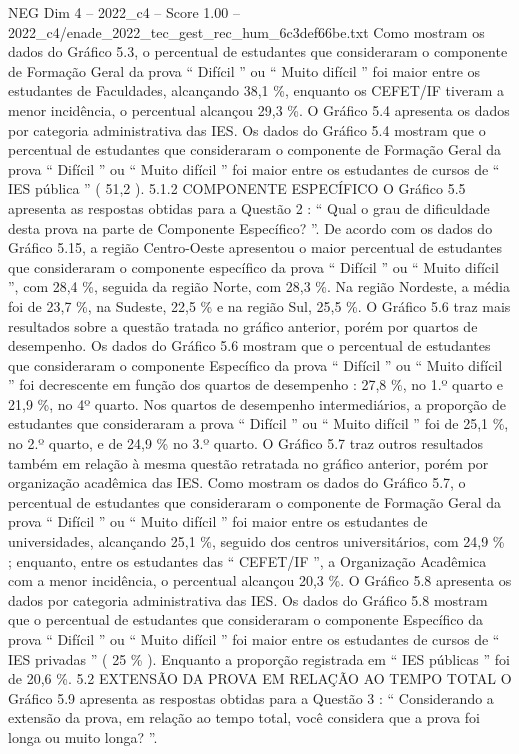 \begin{textsample}{NEG Dim 4 – 2022\_c4 – Score 1.00 – 2022\_c4/enade\_2022\_tec\_gest\_rec\_hum\_6c3def66be.txt}
Como mostram os dados do Gráfico 5.3, o percentual de estudantes que consideraram o componente de Formação Geral da prova “ Difícil ” ou “ Muito difícil ” foi maior entre os estudantes de Faculdades, alcançando 38,1 \%, enquanto os CEFET/IF tiveram a menor incidência, o percentual alcançou 29,3 \%.
O Gráfico 5.4 apresenta os dados por categoria administrativa das IES.
Os dados do Gráfico 5.4 mostram que o percentual de estudantes que consideraram o componente de Formação Geral da prova “ Difícil ” ou “ Muito difícil ” foi maior entre os estudantes de cursos de “ IES pública ” ( 51,2 ). 5.1.2 COMPONENTE ESPECÍFICO O Gráfico 5.5 apresenta as respostas obtidas para a Questão 2 : “ Qual o grau de dificuldade desta prova na parte de Componente Específico? ”.
De acordo com os dados do Gráfico 5.15, a região Centro-Oeste apresentou o maior percentual de estudantes que consideraram o componente específico da prova “ Difícil ” ou “ Muito difícil ”, com 28,4 \%, seguida da região Norte, com 28,3 \%.
Na região Nordeste, a média foi de 23,7 \%, na Sudeste, 22,5 \% e na região Sul, 25,5 \%.
O Gráfico 5.6 traz mais resultados sobre a questão tratada no gráfico anterior, porém por quartos de desempenho.
Os dados do Gráfico 5.6 mostram que o percentual de estudantes que consideraram o componente Específico da prova “ Difícil ” ou “ Muito difícil ” foi decrescente em função dos quartos de desempenho : 27,8 \%, no 1.º quarto e 21,9 \%, no 4º quarto.
Nos quartos de desempenho intermediários, a proporção de estudantes que consideraram a prova “ Difícil ” ou “ Muito difícil ” foi de 25,1 \%, no 2.º quarto, e de 24,9 \% no 3.º quarto.
O Gráfico 5.7 traz outros resultados também em relação à mesma questão retratada no gráfico anterior, porém por organização acadêmica das IES.
Como mostram os dados do Gráfico 5.7, o percentual de estudantes que consideraram o componente de Formação Geral da prova “ Difícil ” ou “ Muito difícil ” foi maior entre os estudantes de universidades, alcançando 25,1 \%, seguido dos centros universitários, com 24,9 \% ; enquanto, entre os estudantes das “ CEFET/IF ”, a Organização Acadêmica com a menor incidência, o percentual alcançou 20,3 \%.
O Gráfico 5.8 apresenta os dados por categoria administrativa das IES.
Os dados do Gráfico 5.8 mostram que o percentual de estudantes que consideraram o componente Específico da prova “ Difícil ” ou “ Muito difícil ” foi maior entre os estudantes de cursos de “ IES privadas ” ( 25 \% ).
Enquanto a proporção registrada em “ IES públicas ” foi de 20,6 \%. 5.2 EXTENSÃO DA PROVA EM RELAÇÃO AO TEMPO TOTAL O Gráfico 5.9 apresenta as respostas obtidas para a Questão 3 : “ Considerando a extensão da prova, em relação ao tempo total, você considera que a prova foi longa ou muito longa? ”.

\end{textsample}
